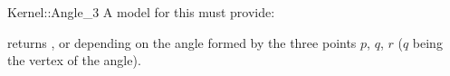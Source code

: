\begin{ccRefFunctionObjectConcept}{Kernel::Angle_3}
A model for this must provide:


{returns ,  or  depending
on the angle formed by the three points $p$, $q$, $r$ ($q$ being the vertex of
the angle).}

\end{ccRefFunctionObjectConcept}

